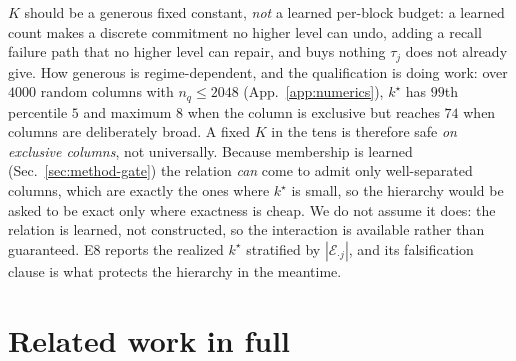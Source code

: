 \documentclass{article}
\begin{document}
$K$ should be a generous fixed constant, \emph{not} a learned per-block budget: a learned count
makes a discrete commitment no higher level can undo, adding a recall failure path that no
higher level can repair, and buys nothing $\tau_j$ does not already give. How generous is
regime-dependent, and the qualification is doing work: over $4000$ random columns with
$n_q\le2048$ (App.~\ref{app:numerics}), $k^\star$ has $99$th percentile $5$ and maximum $8$ when
the column is exclusive but reaches $74$ when columns are deliberately broad. A fixed $K$ in the
tens is therefore safe \emph{on exclusive columns}, not universally. Because membership is
learned (Sec.~\ref{sec:method-gate}) the relation \emph{can} come to admit only well-separated
columns, which are exactly the ones where $k^\star$ is small, so the hierarchy would be asked to
be exact only where exactness is cheap. We do not assume it does: the relation is learned, not
constructed, so the interaction is available rather than guaranteed. E8 reports the realized
$k^\star$ stratified by $|\mathcal{E}_{\cdot j}|$, and its falsification clause is what protects
the hierarchy in the meantime.

\section{Related work in full}
\label{app:related}\label{sec:related}
\end{document}
